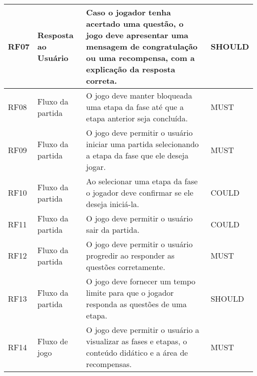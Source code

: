 \begin{table}[htbp]
\begin{tabular}{|p{0.9cm}|p{2.5cm}|p{9.3cm}|p{1.9cm}|}
\textcolor{textmodified}{RF07} & \textcolor{textmodified}{Resposta ao Usuário}       & \textcolor{textmodified}{Caso o jogador tenha acertado uma questão, o jogo deve apresentar uma mensagem de congratulação ou uma recompensa, com a explicação da resposta correta.} & \textcolor{textadded}{SHOULD}  \\ \hline

\textcolor{textmodified}{RF08} & \textcolor{textmodified}{Fluxo da partida}          & \textcolor{textmodified}{O jogo deve manter bloqueada uma etapa da fase até que a etapa anterior seja concluída.} & \textcolor{textadded}{MUST} \\ \hline

\textcolor{textmodified}{RF09} & \textcolor{textmodified}{Fluxo da partida}          & \textcolor{textmodified}{O jogo deve permitir o usuário iniciar uma partida selecionando a etapa da fase que ele deseja jogar.} & \textcolor{textadded}{MUST} \\ \hline

\textcolor{textmodified}{RF10} & \textcolor{textmodified}{Fluxo da partida}            & \textcolor{textmodified}{Ao selecionar uma etapa da fase o jogador deve confirmar se ele deseja iniciá-la.} & \textcolor{textadded}{COULD} \\ \hline

\textcolor{textmodified}{RF11} & \textcolor{textmodified}{Fluxo da partida}            & \textcolor{textmodified}{O jogo deve permitir o usuário sair da partida.} & \textcolor{textadded}{COULD} \\ \hline

\textcolor{textadded}{RF12} & \textcolor{textadded}{Fluxo da partida}            & \textcolor{textadded}{O jogo deve permitir o usuário progredir ao responder as questões corretamente.} & \textcolor{textadded}{MUST} \\ \hline

\textcolor{textadded}{RF13} & \textcolor{textadded}{Fluxo da partida}            & \textcolor{textadded}{O jogo deve fornecer um tempo limite para que o jogador responda as questões de uma etapa.} & \textcolor{textadded}{SHOULD} \\ \hline

\textcolor{textmodified}{RF14} & \textcolor{textmodified}{Fluxo de jogo}            & \textcolor{textmodified}{O jogo deve permitir o usuário a visualizar as fases e etapas, o conteúdo didático e a área de recompensas.} & \textcolor{textadded}{MUST} \\ \hline


\end{tabular}
\end{table}

